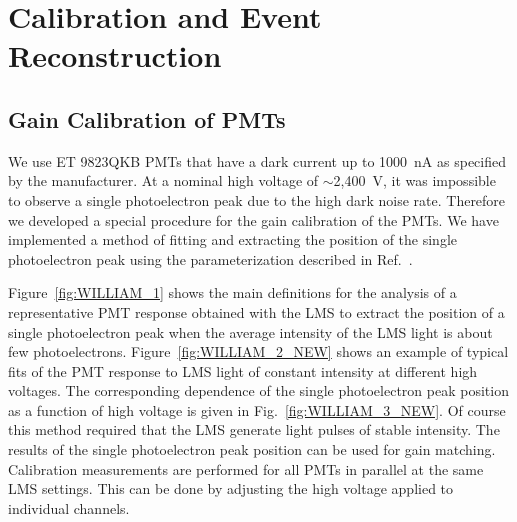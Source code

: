 \section{Calibration and Event Reconstruction}

\subsection{Gain Calibration of PMTs} 

We use ET 9823QKB PMTs that have a dark current up to 1000~nA as specified by the manufacturer. At a
nominal high voltage of $\sim$2,400~V, it was impossible to observe a single photoelectron peak due to the
high dark noise rate. Therefore we developed a special procedure for the gain calibration of the PMTs. We
have implemented a method of fitting and extracting the position of the single photoelectron peak using the
parameterization described in Ref.~\cite{bellamy1996}.

Figure~\ref{fig:WILLIAM_1} shows the main definitions for the analysis of a representative PMT response obtained
with the LMS to extract the  position of a single photoelectron peak when the average intensity of the LMS light
is about few photoelectrons. Figure~\ref{fig:WILLIAM_2_NEW} shows an example of typical fits of the PMT
response to LMS light of constant intensity at different high voltages. The corresponding dependence of the single
photoelectron peak position as a function of high voltage is given in Fig.~\ref{fig:WILLIAM_3_NEW}. Of course
this method required that the LMS generate light pulses of stable intensity. The results of the single photoelectron
peak position can be used for gain matching. Calibration measurements are performed for all PMTs in parallel at the
same LMS settings. This can be done by adjusting the high voltage applied to individual channels.

